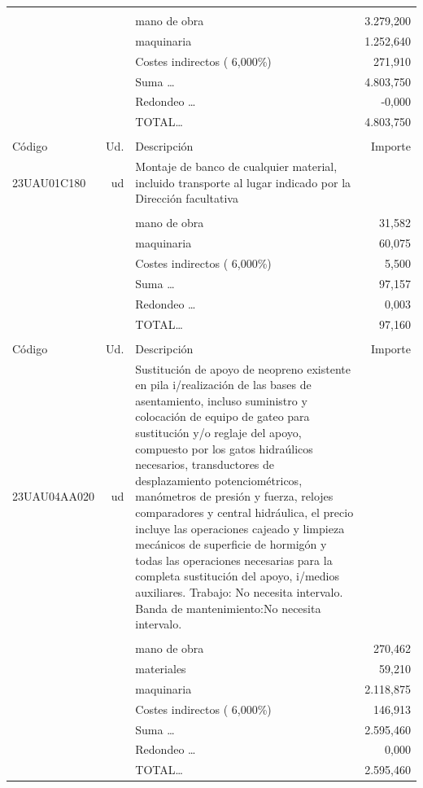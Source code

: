 \begin{supertabular}{l r p{60mm} r}
&&&\\%
&&mano de obra& 3.279,200\\%
&&maquinaria& 1.252,640\\%
&&Costes indirectos (     6,000\%)&   271,910\\%
&&Suma \ldots& 4.803,750\\%
&&Redondeo \ldots&    {-}0,000\\%
%
&&TOTAL\ldots& 4.803,750\\%
&&&\\%
Código&Ud.&Descripción&Importe\\%
\hline%
23UAU01C180&ud&Montaje de banco de cualquier material, incluido transporte al lugar indicado por la Dirección facultativa&\\%
&&&\\%
&&mano de obra&    31,582\\%
&&maquinaria&    60,075\\%
&&Costes indirectos (     6,000\%)&     5,500\\%
&&Suma \ldots&    97,157\\%
&&Redondeo \ldots&     0,003\\%
%
&&TOTAL\ldots&    97,160\\%
&&&\\%
Código&Ud.&Descripción&Importe\\%
\hline%
23UAU04AA020&ud&Sustitución de apoyo de neopreno existente en pila i/realización de las bases de asentamiento, incluso suministro y colocación de equipo de gateo para sustitución y/o reglaje del apoyo, compuesto por los gatos hidraúlicos necesarios, transductores de desplazamiento potenciométricos, manómetros de presión y fuerza, relojes comparadores y central hidráulica, el precio incluye las operaciones cajeado y limpieza mecánicos de superficie de hormigón y todas las operaciones necesarias para la completa sustitución del apoyo, i/medios auxiliares. Trabajo: No necesita intervalo. Banda de mantenimiento:No necesita intervalo.&\\%
&&&\\%
&&mano de obra&   270,462\\%
&&materiales&    59,210\\%
&&maquinaria& 2.118,875\\%
&&Costes indirectos (     6,000\%)&   146,913\\%
&&Suma \ldots& 2.595,460\\%
&&Redondeo \ldots&     0,000\\%
%
&&TOTAL\ldots& 2.595,460\\%

\end{supertabular}
